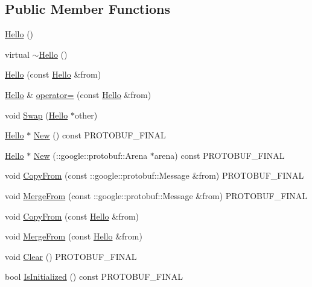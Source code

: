 \subsection*{Public Member Functions}
\begin{DoxyCompactItemize}
\item 
\hyperlink{class_hello_aaa8dc2cd664f8a83b9119a06b2f2790c}{Hello} ()
\item 
virtual \hyperlink{class_hello_a569543163e99839e6660585a4da3cdb3}{$\sim$\+Hello} ()
\item 
\hyperlink{class_hello_a94629d8ee4ad1de07e6e1bc6caddbd94}{Hello} (const \hyperlink{class_hello}{Hello} \&from)
\item 
\hyperlink{class_hello}{Hello} \& \hyperlink{class_hello_a15170120459149d2afa0664043310aba}{operator=} (const \hyperlink{class_hello}{Hello} \&from)
\item 
void \hyperlink{class_hello_ad6357f818fe5880dbb9ecfd576792e57}{Swap} (\hyperlink{class_hello}{Hello} $\ast$other)
\item 
\hyperlink{class_hello}{Hello} $\ast$ \hyperlink{class_hello_a82f489be1812b29e8d223a8766ae4429}{New} () const P\+R\+O\+T\+O\+B\+U\+F\+\_\+\+F\+I\+N\+AL
\item 
\hyperlink{class_hello}{Hello} $\ast$ \hyperlink{class_hello_aa74408a5e02a6c1f210c60baa6943eb8}{New} (\+::google\+::protobuf\+::\+Arena $\ast$arena) const P\+R\+O\+T\+O\+B\+U\+F\+\_\+\+F\+I\+N\+AL
\item 
void \hyperlink{class_hello_a52a119640ef64a9cb358eae73e501bda}{Copy\+From} (const \+::google\+::protobuf\+::\+Message \&from) P\+R\+O\+T\+O\+B\+U\+F\+\_\+\+F\+I\+N\+AL
\item 
void \hyperlink{class_hello_ad6892c85ff3d7ed75041b9860048ae5c}{Merge\+From} (const \+::google\+::protobuf\+::\+Message \&from) P\+R\+O\+T\+O\+B\+U\+F\+\_\+\+F\+I\+N\+AL
\item 
void \hyperlink{class_hello_ac907e8ea750599e3e4ba8721b0b411b6}{Copy\+From} (const \hyperlink{class_hello}{Hello} \&from)
\item 
void \hyperlink{class_hello_af01676342b30ab0ea8c04893df6ea19d}{Merge\+From} (const \hyperlink{class_hello}{Hello} \&from)
\item 
void \hyperlink{class_hello_ac8101ec411f42fe3f6919485906d88a7}{Clear} () P\+R\+O\+T\+O\+B\+U\+F\+\_\+\+F\+I\+N\+AL
\item 
bool \hyperlink{class_hello_ac0f433ab08575f23a190c93a33e0ff29}{Is\+Initialized} () const P\+R\+O\+T\+O\+B\+U\+F\+\_\+\+F\+I\+N\+AL
\item 

\end{DoxyCompactItemize}
